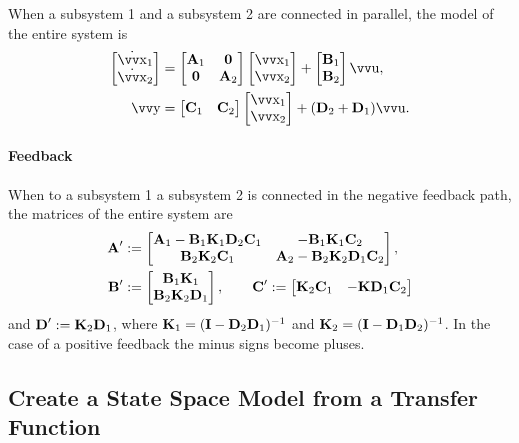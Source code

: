 When a subsystem 1 and a subsystem 2 are connected in parallel, the model of the entire system is
\begin{align*}
	\begin{bmatrix}
		\dot{\vec{x}}_1 \\ \dot{\vec{x}}_2
	\end{bmatrix}
	&=
	\begin{bmatrix}
			\mx{A}_1 & \mx{0} \\
			\mx{0} & \mx{A}_2 
	\end{bmatrix}
	\begin{bmatrix}
		\vec{x}_1 \\ \vec{x}_2
	\end{bmatrix}
	+
	\begin{bmatrix}
		\mx{B}_1 \\ \mx{B}_2
	\end{bmatrix}
	\vec{u},
	\\
	\vec{y}
	&=
	\begin{bmatrix}
		\mx{C}_1 & \mx{C}_2
	\end{bmatrix}
	\begin{bmatrix}
		\vec{x}_1 \\ \vec{x}_2
	\end{bmatrix}
	+
	(\mx{D}_2 + \mx{D}_1) \vec{u}.
\end{align*}

\paragraph{Feedback}

When to a subsystem 1 a subsystem 2 is connected in the negative feedback path, the matrices of the entire system are
\begin{align*}
	\bm{\mathrm{A}}' &:=
	\begin{bmatrix}
		\bm{\mathrm{A}}_1 - \bm{\mathrm{B}}_1 \bm{\mathrm{K}}_1 \bm{\mathrm{D}}_2 \bm{\mathrm{C}}_1 &
		-\bm{\mathrm{B}}_1 \bm{\mathrm{K}}_1 \bm{\mathrm{C}}_2 \\
		\bm{\mathrm{B}}_2 \bm{\mathrm{K}}_2 \bm{\mathrm{C}}_1 &
		\bm{\mathrm{A}}_2 - \bm{\mathrm{B}}_2 \bm{\mathrm{K}}_2 \bm{\mathrm{D}}_1 \bm{\mathrm{C}}_2
	\end{bmatrix},
	\\
	\bm{\mathrm{B}}' &:= 
	\begin{bmatrix}
		\bm{\mathrm{B}}_1 \bm{\mathrm{K}}_1 \\ \bm{\mathrm{B}}_2 \bm{\mathrm{K}}_2 \bm{\mathrm{D}}_1
	\end{bmatrix},
	\qquad
	\bm{\mathrm{C}}' := 
	\begin{bmatrix}
		\bm{\mathrm{K}}_2 \bm{\mathrm{C}}_1 &
		-\bm{\mathrm{K}} \bm{\mathrm{D}}_1 \bm{\mathrm{C}}_2
	\end{bmatrix}
\end{align*}
and \(\bm{\mathrm{D}}' := \bm{\mathrm{K}}_2 \bm{\mathrm{D}}_1\), where \(\bm{\mathrm{K}}_1 = (\bm{\mathrm{I}} - \bm{\mathrm{D}}_2 \bm{\mathrm{D}}_1)^{-1}\) and  \(\bm{\mathrm{K}}_2 = (\bm{\mathrm{I}} - \bm{\mathrm{D}}_1 \bm{\mathrm{D}}_2)^{-1}\). In the case of a positive feedback the minus signs become pluses.

\subsection{Create a State Space Model from a Transfer Function}

